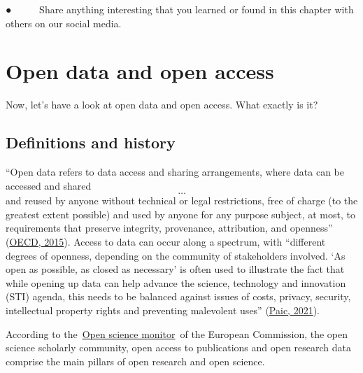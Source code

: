\documentclass[
]{book}
\begin{document}
● ~ ~ ~ Share anything interesting that you learned or found in this chapter with others on our social media.

\hypertarget{open-data-and-open-access}{%
\chapter{\texorpdfstring{\textbf{Open data and open access}}{Open data and open access}}\label{open-data-and-open-access}}

Now, let's have a look at open data and open access. What exactly is it?~

\hypertarget{definitions-and-history}{%
\section{\texorpdfstring{\textbf{Definitions and history}}{Definitions and history}}\label{definitions-and-history}}

``Open data refers to data access and sharing arrangements, where data can be accessed and shared \[…\] and reused by anyone without technical or legal restrictions, free of charge (to the greatest extent possible) and used by anyone for any purpose subject, at most, to requirements that preserve integrity, provenance, attribution, and openness'' (\href{https://www.oecd-ilibrary.org/science-and-technology/making-open-science-a-reality_5jrs2f963zs1-en}{OECD, 2015}). Access to data can occur along a spectrum, with ``different degrees of openness, depending on the community of stakeholders involved. `As open as possible, as closed as necessary' is often used to illustrate the fact that while opening up data can help advance the science, technology and innovation (STI) agenda, this needs to be balanced against issues of costs, privacy, security, intellectual property rights and preventing malevolent uses'' (\href{https://goingdigital.oecd.org/data/notes/No13_ToolkitNote_OpenScience.pdf}{Paic, 2021}).

According to the~\href{https://ec.europa.eu/info/research-and-innovation/strategy/strategy-2020-2024/our-digital-future/open-science/open-science-monitor_en}{}\href{https://ec.europa.eu/info/research-and-innovation/strategy/strategy-2020-2024/our-digital-future/open-science/open-science-monitor_en}{Open science monitor}~of the European Commission, the open science scholarly community, open access to publications and open research data comprise the main pillars of open research and open science.
\end{document}
